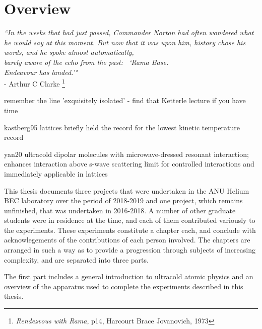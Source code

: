 

\chapter{Overview}
\begin{adjustwidth}{3cm}{0cm}
\begin{flushright}
{\emph{``In the weeks that had just passed, Commander Norton had often wondered what he would say at this moment. But now that it was upon him, history chose his words, and he spoke almost automatically, \\barely aware of the echo from the past: ~`Rama Base.\\ \emph{Endeavour} has landed.'"\\} 
- Arthur C Clarke \footnote{\emph{Rendezvous with Rama}, p14, Harcourt Brace Jovanovich, 1973}}
\end{flushright}
\end{adjustwidth}


remember the line 'exquisitely isolated' - find that Ketterle lecture if you have time

kastberg95
		lattices briefly held the record for the lowest kinetic temperature record

yan20 ultracold dipolar molecules with microwave-dressed resonant interaction; enhances interaction above s-wave scattering limit for controlled interactions and immediately applicable in lattices

This thesis documents three projects that were undertaken in the ANU
Helium BEC laboratory over the period of 2018-2019 and one project,
which remains unfinished, that was undertaken in 2016-2018. A number of
other graduate students were in residence at the time, and each of them
contributed variously to the experiments. These experiments constitute a
chapter each, and conclude with acknowlegements of the contributions of
each person involved. The chapters are arranged in such a way as to
provide a progression through subjects of increasing complexity, and are
separated into three parts.

The first part includes a general introduction to ultracold atomic
physics and an overview of the apparatus used to complete the
experiments described in this thesis.

